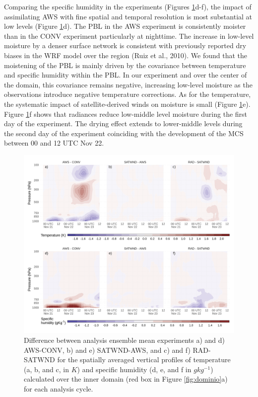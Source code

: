 \documentclass[final,5p,times,twocolumn,authoryear]{elsarticle} %
\begin{document}
Comparing the specific humidity in the experiments (Figures \ref{fig:TQ-diff}d-f), the impact of assimilating AWS with fine spatial and temporal resolution is most substantial at low levels (Figure \ref{fig:TQ-diff}d). The PBL in the AWS experiment is consistently moister than in the CONV experiment particularly at nighttime. The increase in low-level moisture by a denser surface network is consistent with previously reported dry biases in the WRF model over the region (Ruiz et al., 2010). We found that the moistening of the PBL is mainly driven by the covariance between temperature and specific humidity within the PBL. In our experiment and over the center of the domain, this covariance remains negative, increasing low-level moisture as the observations introduce negative temperature corrections. As for the temperature, the systematic impact of satellite-derived winds on moisture is small (Figure \ref{fig:TQ-diff}e). Figure \ref{fig:TQ-diff}f shows that radiances reduce low-middle level moisture during the first day of the experiment. The drying effect extends to lower-middle levels during the second day of the experiment coinciding with the development of the MCS between 00 and 12 UTC Nov 22.



\begin{figure}[th]

{\centering \includegraphics{../figures/TQ-diff-1} 

}

\caption{Difference between analysis ensemble mean experiments a) and d) AWS-CONV, b) and e) SATWND-AWS, and c) and f) RAD-SATWND for the spatially averaged vertical profiles of temperature (a, b, and c, in \(K\)) and specific humidity (d, e, and f in \(gkg^{-1}\)) calculated over the inner domain (red box in Figure \ref{fig:dominio}a) for each analysis cycle.}\label{fig:TQ-diff}
\end{figure}
\end{document}

